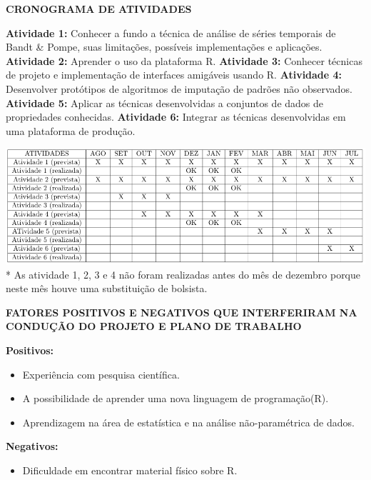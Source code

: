 \documentclass{article}
\begin{document}
\newpage
\begin{center}
\textbf{\large{CRONOGRAMA DE ATIVIDADES}}

\hrulefill 

\end{center}

\begin{flushleft}    
\textbf{Atividade 1:} Conhecer a fundo a técnica de análise de séries temporais de Bandt \& Pompe, suas limitações, possíveis implementações e aplicações.
\newline
\textbf{Atividade 2:} Aprender o uso da plataforma R.
\newline
\textbf{Atividade 3:} Conhecer técnicas de projeto e implementação de interfaces amigáveis usando R.
\newline
\textbf{Atividade 4:} Desenvolver protótipos de algoritmos de imputação de padrões não observados.
\newline
\textbf{Atividade 5:} Aplicar as técnicas desenvolvidas a conjuntos de dados de propriedades conhecidas.
\newline
\textbf{Atividade 6:} Integrar as técnicas desenvolvidas em uma plataforma de produção.
\end{flushleft}
\includegraphics[width=1.1\columnwidth]{tabela}
* As atividade 1, 2, 3 e 4 não foram realizadas antes do mês de dezembro porque neste mês houve uma substituição de bolsista.

\newpage
\begin{center}
\textbf{\large{FATORES POSITIVOS E NEGATIVOS QUE INTERFERIRAM NA CONDUÇÃO DO PROJETO E PLANO DE TRABALHO}}

\hrulefill 

\end{center}
\textbf{Positivos:}
\begin{itemize}
    \item Experiência com pesquisa científica.
    \item A possibilidade de aprender uma nova linguagem de programação(R).
    \item Aprendizagem na área de estatística e na análise não-paramétrica de dados.
\end{itemize}
\textbf{Negativos:}
\begin{itemize}
    \item Dificuldade em encontrar material físico sobre R.
\end{itemize}

\newpage


\end{document}
